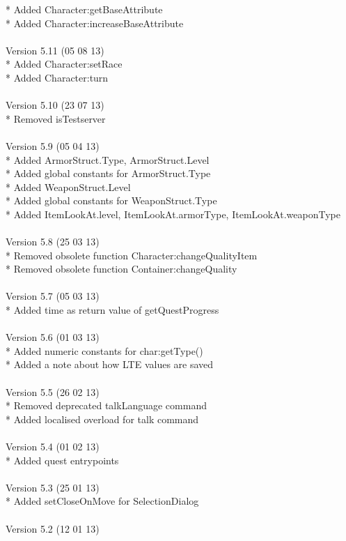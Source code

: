 \documentclass[a4paper,10pt,makeidx]{scrreprt}
\begin{document}
* Added Character:getBaseAttribute\\
* Added Character:increaseBaseAttribute\\
\\
Version 5.11 (05 08 13)\\
* Added Character:setRace\\
* Added Character:turn\\
\\
Version 5.10 (23 07 13)\\
* Removed isTestserver\\
\\
Version 5.9 (05 04 13)\\
* Added ArmorStruct.Type, ArmorStruct.Level\\
* Added global constants for ArmorStruct.Type\\
* Added WeaponStruct.Level\\
* Added global constants for WeaponStruct.Type\\
* Added ItemLookAt.level, ItemLookAt.armorType, ItemLookAt.weaponType\\
\\
Version 5.8 (25 03 13)\\
* Removed obsolete function Character:changeQualityItem\\
* Removed obsolete function Container:changeQuality\\
\\
Version 5.7 (05 03 13)\\
* Added time as return value of getQuestProgress\\
\\
Version 5.6 (01 03 13)\\
* Added numeric constants for char:getType()\\
* Added a note about how LTE values are saved\\
\\
Version 5.5 (26 02 13)\\
* Removed deprecated talkLanguage command\\
* Added localised overload for talk command\\
\\
Version 5.4 (01 02 13)\\
* Added quest entrypoints\\
\\
Version 5.3 (25 01 13)\\
* Added setCloseOnMove for SelectionDialog\\
\\
Version 5.2 (12 01 13)\\
\end{document}
